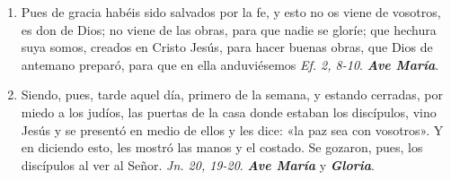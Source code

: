 \documentclass[../../devocionario.tex]{subfiles}
\begin{document}
\begin{enumerate}
        \item Pues de gracia habéis sido salvados por la fe, y esto no os viene de vosotros, es don de Dios; no viene de las obras, para que nadie se gloríe; que hechura suya somos,
            creados en Cristo Jesús, para hacer buenas obras, que Dios de antemano preparó, para que en ella anduviésemos \emph{Ef. 2, 8-10}. \textbf{\emph{Ave María}}.        

        \item Siendo, pues, tarde aquel día, primero de la semana, y estando cerradas, por miedo a los judíos, las puertas de la casa donde estaban los discípulos, vino Jesús y 
            se presentó en medio de ellos y les dice: «la paz sea con vosotros». Y en diciendo esto, les mostró las manos y el costado. Se gozaron, pues, 
            los discípulos al ver al Señor. \emph{Jn. 20, 19-20}. \textbf{\emph{Ave María}} y \textbf{\emph{Gloria}}.

    \end{enumerate}
\end{document}
